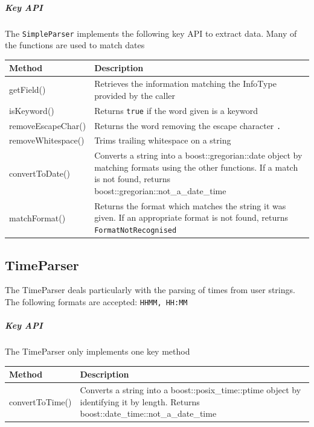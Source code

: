 \documentclass[12pt]{extarticle}
\begin{document}
\subparagraph{Key API}The \texttt{SimpleParser} implements the following key API to extract data. Many of the functions are used to match dates\\
\begin{tabular}{p{6cm} p{12cm}}
Method & Description\\
\hline
getField() & Retrieves the information matching the InfoType provided by the caller\\
isKeyword() & Returns \texttt{true} if the word given is a keyword\\
removeEscapeChar() & Returns the word removing the escape character \texttt{.}\\
removeWhitespace() & Trims trailing whitespace on a string\\
convertToDate() & Converts a string into a boost::gregorian::date object by matching formats using the other functions. If a match is not found, returns boost::gregorian::not\_a\_date\_time\\
matchFormat() & Returns the format which matches the string it was given. If an appropriate format is not found, returns \texttt{FormatNotRecognised}\\
\end{tabular}

\subsection{TimeParser}
The TimeParser deals particularly with the parsing of times from user strings. The following formats are accepted: \texttt{HHMM, HH:MM}

\subparagraph{Key API}
The TimeParser only implements one key method\\
\begin{tabular}{p{6cm} p{12cm}}
Method & Description\\
\hline
convertToTime() & Converts a string into a boost::posix\_time::ptime object by identifying it by length. Returns boost::date\_time::not\_a\_date\_time
\end{tabular}
\end{document}

